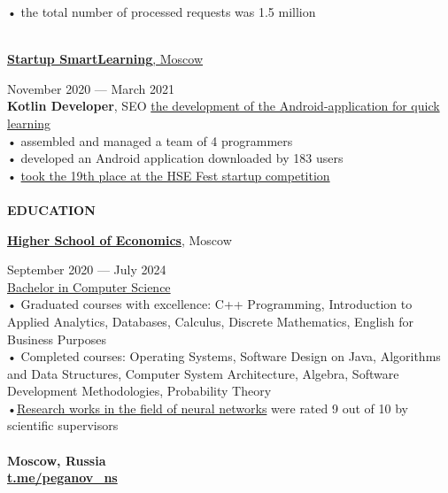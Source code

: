 \documentclass{article}
\begin{document}
\begin{vwcol}[widths={0.8,0.2},
 sep=.8cm, justify=flush,rule=0pt,indent=1em]
• the total number of processed requests was 1.5 million\\
\\
\begin{Large}
\href{https://www.canva.com/design/DAEaT9nPC7Y/y7_r2BzUEiUiFKW36oP-Pw/view?utm_content=DAEaT9nPC7Y&utm_campaign=designshare&utm_medium=link&utm_source=publishsharelink}{\textbf{Startup SmartLearning}, Moscow}
\end{Large}
\hspace{70pt}November 2020 — March 2021\\
\textbf{Kotlin Developer}, SEO \href{https://gitlab.com/peganov.nik/smartlearning}{the development of the Android-application for quick learning}\\
• assembled and managed a team of 4 programmers\\
• developed an Android application downloaded by 183 users\\
• \href{https://fest.hse.ru/top1002021}{took the 19th place at the HSE Fest startup competition}\\
\\
\noindent\textcolor[rgb]{0.1255,0.2902,0.7843}{\textbf{\Large{EDUCATION}}}\\
\begin{Large}
\textbf{\href{https://hse.ru/}{Higher School of Economics}}, Moscow
\end{Large}
\hspace{43pt}September 2020 — July 2024\\
\href{https://cs.hse.ru/}{Bachelor in Computer Science}\\
• Graduated courses with excellence: C++ Programming, Introduction to Applied Analytics, Databases, Calculus, Discrete Mathematics, English for Business Purposes\\
• Completed courses: Operating Systems, Software Design on Java, Algorithms and Data Structures, Computer System Architecture, Algebra, Software Development Methodologies, Probability Theory\\
•\href{https://github.com/NikPeg/synchronization-of-neuromorphic-networks-of-the-close-world-from-the-point-of-view-of-complexes} {Research works in the field of neural networks} were rated 9 out of 10 by scientific supervisors\\
\newpage
~\\
\noindent\textbf{Moscow, Russia}\\
\noindent\textbf{\textcolor[rgb]{0.1255,0.2902,0.7843}{\href{https://t.me/peganov\_ns}{t.me/peganov\_ns}}}\\

\end{vwcol}
\end{document}

